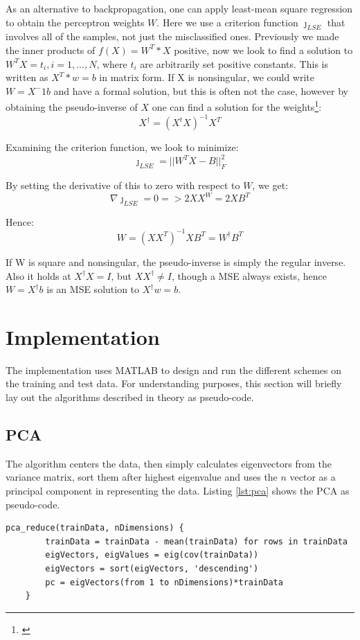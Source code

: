 \documentclass[journal]{IEEEtran}
\begin{document}
As an alternative to backpropagation, one can apply least-mean square regression to obtain the perceptron weights $W$. Here we use a criterion function ${\jmath}_{LSE}$ that involves all of the samples, not just the misclassified ones. Previously we made the inner products of $f(X) = W^T*X$ positive, now we look to find a solution to $W^T X = t_{i}, i = 1, ..., N$, where $t_{i}$ are arbitrarily set positive constants. This is written as $X^T*w = b$ in matrix form. If X is nonsingular, we could write $W = X^-1 b$ and have a formal solution, but this is often not the case, however by obtaining the pseudo-inverse of $X$ one can find a solution for the weights\footnote{\cite{Duda2012}}: $$ X^\dagger = (X^tX)^{-1}X^T $$

Examining the criterion function, we look to minimize: $$ {\jmath}_{LSE} = ||W^T X - B||^2_{F} $$

By setting the derivative of this to zero with respect to $W$, we get: $$ \nabla{\jmath}_{LSE} = 0 => 2XX^W = 2XB^T $$

Hence: $$ W = (XX^T)^{-1} XB^T = W^\dagger B^T $$

If W is square and nonsingular, the pseudo-inverse is simply the regular inverse. Also it holds at $X^\dagger X = I$, but $X X^\dagger \neq I$, though a MSE always exists, hence $W = X^\dagger b$ is an MSE solution to $X^\dagger w = b$.

\section{Implementation}

The implementation uses MATLAB to design and run the different schemes on the training and test data. For understanding purposes, this section will briefly lay out the algorithms described in theory as pseudo-code.

\subsection{PCA} 

The algorithm centers the data, then simply calculates eigenvectors from the variance matrix, sort them after highest eigenvalue and uses the $n$ vector as a principal component in representing the data. Listing \ref{lst:pca} shows the PCA as pseudo-code.

\begin{lstlisting}[caption=Implementation of PCA., label={lst:pca}, belowskip=-0.8 \baselineskip]
	pca_reduce(trainData, nDimensions) {
		trainData = trainData - mean(trainData) for rows in trainData
		eigVectors, eigValues = eig(cov(trainData))
		eigVectors = sort(eigVectors, 'descending')
		pc = eigVectors(from 1 to nDimensions)*trainData
	}
\end{lstlisting}
\end{document}
